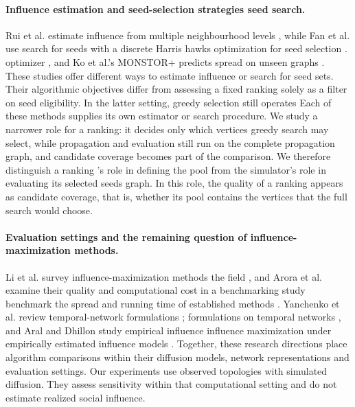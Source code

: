 \documentclass[smallextended]{svjour3}
\providecommand{\DIFaddtex}[1]{{\protect\color{blue} \sf #1}} %
\providecommand{\DIFdeltex}[1]{{\protect\color{red} \scriptsize #1}} %
\providecommand{\DIFaddbegin}{} %
\providecommand{\DIFaddend}{} %
\providecommand{\DIFdelbegin}{} %
\providecommand{\DIFdelend}{} %
\providecommand{\DIFadd}[1]{\texorpdfstring{\DIFaddtex{#1}}{#1}} %
\providecommand{\DIFdel}[1]{\texorpdfstring{\DIFdeltex{#1}}{}} %
\providecommand{\DIFscaledelfig}{0.5}
\newlength{\DIFdelgraphicswidth} %
\newlength{\DIFdelgraphicsheight} %
\providecommand{\DIFaddincludegraphics}[2][]{{\color{blue}\fbox{\DIFOincludegraphics[#1]{#2}}}} %
\providecommand{\DIFdelincludegraphics}[2][]{%
\sbox{\DIFdelgraphicsbox}{\DIFOincludegraphics[#1]{#2}}%
\settoboxwidth{\DIFdelgraphicswidth}{\DIFdelgraphicsbox} %
\settoboxtotalheight{\DIFdelgraphicsheight}{\DIFdelgraphicsbox} %
\scalebox{\DIFscaledelfig}{%
\parbox[b]{\DIFdelgraphicswidth}{\usebox{\DIFdelgraphicsbox}\\[-\baselineskip] \rule{\DIFdelgraphicswidth}{0em}}\llap{\resizebox{\DIFdelgraphicswidth}{\DIFdelgraphicsheight}{%
\setlength{\unitlength}{\DIFdelgraphicswidth}%
\begin{picture}(1,1)%
\thicklines\linethickness{2pt} %
{\color[rgb]{1,0,0}\put(0,0){\framebox(1,1){}}}%
{\color[rgb]{1,0,0}\put(0,0){\line( 1,1){1}}}%
{\color[rgb]{1,0,0}\put(0,1){\line(1,-1){1}}}%
\end{picture}%
}\hspace*{3pt}}} %
} %
\DeclareRobustCommand{\DIFaddbegin}{\DIFOaddbegin \let\includegraphics\DIFaddincludegraphics} %
\DeclareRobustCommand{\DIFaddend}{\DIFOaddend \let\includegraphics\DIFOincludegraphics} %
\DeclareRobustCommand{\DIFdelbegin}{\DIFOdelbegin \let\includegraphics\DIFdelincludegraphics} %
\DeclareRobustCommand{\DIFdelend}{\DIFOaddend \let\includegraphics\DIFOincludegraphics} %
\begin{document}
\paragraph{Influence estimation and \DIFdelbegin \DIFdel{seed-selection strategies}\DIFdelend \DIFaddbegin \DIFadd{seed search}\DIFaddend .} Rui et al. estimate influence from multiple neighbourhood levels \cite{ref12}, \DIFdelbegin \DIFdel{while }\DIFdelend Fan et al. \DIFdelbegin \DIFdel{use }\DIFdelend \DIFaddbegin \DIFadd{search for seeds with a }\DIFaddend discrete Harris hawks \DIFdelbegin \DIFdel{optimization for seed selection \cite{ref13}. }\DIFdelend \DIFaddbegin \DIFadd{optimizer \cite{ref13}, and }\DIFaddend Ko et al.'s MONSTOR+ predicts spread on unseen graphs \cite{ref19}. \DIFdelbegin \DIFdel{These studies offer different ways to estimate influence or search for seed sets. Their algorithmic objectives differ from assessing a fixed ranking solely as a filter on seed eligibility. In the latter setting, greedy selection still operates }\DIFdelend \DIFaddbegin \DIFadd{Each of these methods supplies its own estimator or search procedure. We study a narrower role for a ranking: it decides only which vertices greedy search may select, while propagation and evaluation still run }\DIFaddend on the complete \DIFdelbegin \DIFdel{propagation graph, and candidate coverage becomes part of the comparison. We therefore distinguish a ranking 's role in defining the pool from the simulator's role in evaluating its selected seeds}\DIFdelend \DIFaddbegin \DIFadd{graph. In this role, the quality of a ranking appears as candidate coverage, that is, whether its pool contains the vertices that the full search would choose}\DIFaddend .

\paragraph{Evaluation \DIFdelbegin \DIFdel{settings and the remaining question}\DIFdelend \DIFaddbegin \DIFadd{of influence-maximization methods}\DIFaddend .} Li et al. survey \DIFdelbegin \DIFdel{influence-maximization methods }\DIFdelend \DIFaddbegin \DIFadd{the field }\DIFaddend \cite{ref9}, and Arora et al. \DIFdelbegin \DIFdel{examine their quality and computational cost in a benchmarking study }\DIFdelend \DIFaddbegin \DIFadd{benchmark the spread and running time of established methods }\DIFaddend \cite{ref16}. Yanchenko et al. review \DIFdelbegin \DIFdel{temporal-network formulations \cite{ref11}; }\DIFdelend \DIFaddbegin \DIFadd{formulations on temporal networks \cite{ref11}, and }\DIFaddend Aral and Dhillon study \DIFdelbegin \DIFdel{empirical influence }\DIFdelend \DIFaddbegin \DIFadd{influence maximization under empirically estimated influence }\DIFaddend models \cite{ref15}. Together, these \DIFdelbegin \DIFdel{research directions place algorithm comparisons within their diffusion models, network representations and evaluation settings. Our experiments use observed topologies with simulated diffusion. They assess sensitivity within that computational setting and do not estimate realized social influence.
}%
\end{document}
